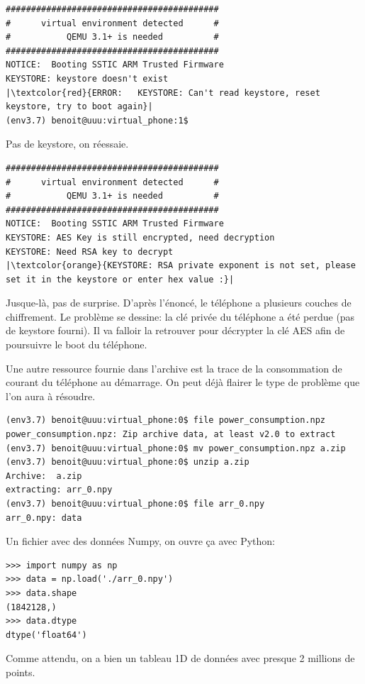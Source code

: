 \documentclass[14pt]{article}
\theoremstyle{definition}
\begin{document}
\begin{verbatim}
##########################################
#      virtual environment detected      #
#           QEMU 3.1+ is needed          #
##########################################
NOTICE:  Booting SSTIC ARM Trusted Firmware
KEYSTORE: keystore doesn't exist
|\textcolor{red}{ERROR:   KEYSTORE: Can't read keystore, reset keystore, try to boot again}|
(env3.7) benoit@uuu:virtual_phone:1$
\end{verbatim}

Pas de keystore, on réessaie.
\begin{verbatim}
##########################################
#      virtual environment detected      #
#           QEMU 3.1+ is needed          #
##########################################
NOTICE:  Booting SSTIC ARM Trusted Firmware
KEYSTORE: AES Key is still encrypted, need decryption
KEYSTORE: Need RSA key to decrypt
|\textcolor{orange}{KEYSTORE: RSA private exponent is not set, please set it in the keystore or enter hex value :}|
\end{verbatim}

Jusque-là, pas de surprise. D'après l'énoncé, le téléphone a plusieurs couches de chiffrement.
Le problème se dessine: la clé privée du téléphone a été perdue (pas de keystore fourni). Il va falloir la retrouver pour décrypter la clé AES afin de poursuivre le boot du téléphone.

Une autre ressource fournie dans l'archive est la trace de la consommation de courant du téléphone au démarrage. On peut déjà flairer le type de problème que l'on aura à résoudre.
\begin{verbatim}
(env3.7) benoit@uuu:virtual_phone:0$ file power_consumption.npz
power_consumption.npz: Zip archive data, at least v2.0 to extract
(env3.7) benoit@uuu:virtual_phone:0$ mv power_consumption.npz a.zip
(env3.7) benoit@uuu:virtual_phone:0$ unzip a.zip
Archive:  a.zip
extracting: arr_0.npy
(env3.7) benoit@uuu:virtual_phone:0$ file arr_0.npy
arr_0.npy: data
\end{verbatim}

Un fichier avec des données Numpy, on ouvre ça avec Python:
\begin{verbatim}
>>> import numpy as np
>>> data = np.load('./arr_0.npy')
>>> data.shape
(1842128,)
>>> data.dtype
dtype('float64')
\end{verbatim}

Comme attendu, on a bien un tableau 1D de données avec presque 2 millions de points.
\end{document}
